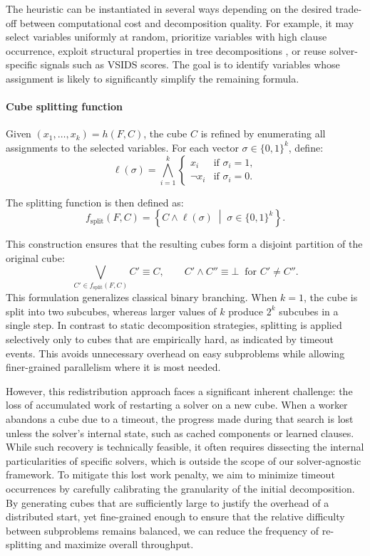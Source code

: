 \documentclass{report}
\begin{document}
The heuristic can be instantiated in several ways depending on the desired trade-off between computational cost and decomposition quality. 
For example, it may select variables uniformly at random, prioritize variables with high clause occurrence, 
exploit structural properties in tree decompositions \cite{tree-decomp},
or reuse solver-specific signals such as VSIDS scores. 
The goal is to identify variables whose assignment is likely to significantly simplify the remaining formula.

\paragraph{Cube splitting function}
Given $(x_1,\dots,x_k) = h(F,C)$, the cube $C$ is refined by enumerating all assignments to the selected variables. For each vector $\sigma \in \{0,1\}^k$, define:
\[
\ell(\sigma) = \bigwedge_{i=1}^{k}
\begin{cases}
x_i & \text{if } \sigma_i = 1,\\
\neg x_i & \text{if } \sigma_i = 0.
\end{cases}
\]

The splitting function is then defined as:
\[
f_{\text{split}}(F,C) =
\left\{
C \land \ell(\sigma) \;\middle|\; \sigma \in \{0,1\}^k
\right\}.
\]

This construction ensures that the resulting cubes form a disjoint partition of the original cube:
\[
\bigvee_{C' \in f_{\text{split}}(F,C)} C' \equiv C,
\qquad
C' \land C'' \equiv \bot \;\; \text{for } C' \neq C''.
\]
This formulation generalizes classical binary branching. When $k=1$, 
the cube is split into two subcubes, whereas larger values of $k$ produce $2^k$ subcubes in a single step. 
In contrast to static decomposition strategies, splitting is applied selectively only to cubes that are empirically hard, 
as indicated by timeout events. This avoids unnecessary overhead on easy subproblems while allowing 
finer-grained parallelism where it is most needed.


However, this redistribution approach faces a significant inherent challenge: the loss of accumulated work
of restarting a solver on a new cube. When a worker abandons a cube due to a timeout, 
the progress made during that search is lost unless the solver’s internal state, such as cached components or learned clauses.
While such recovery is technically feasible, it often requires dissecting the internal particularities of specific solvers,
which is outside the scope of our solver-agnostic framework. To mitigate this lost work penalty, 
we aim to minimize timeout occurrences by carefully calibrating the granularity of the initial decomposition. 
By generating cubes that are sufficiently large to justify the overhead of a distributed start, 
yet fine-grained enough to ensure that the relative difficulty between subproblems remains balanced, 
we can reduce the frequency of re-splitting and maximize overall throughput.
\vspace{-1.5em}
\end{document}
